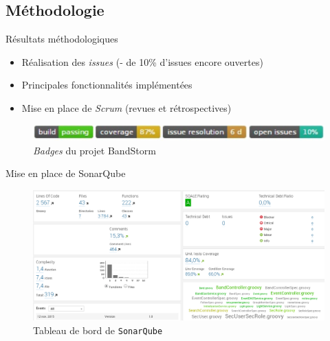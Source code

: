 
\subsection{Méthodologie}
\DylanSpeak
\begin{frame}{Résultats méthodologiques}
	\begin{itemize}
	\item Réalisation des \textit{issues} \scriptsize{(- de 10\% d’issues encore ouvertes)}
	\normalsize
	\item Principales fonctionnalités implémentées
	\item Mise en place de \textit{Scrum} \scriptsize{(revues et rétrospectives)}
	\end{itemize}
	\begin{figure}[H]
		\centering
		\includegraphics[width=0.8\linewidth]{"images/Results/methodo/badges"}
		\caption{\textit{Badges} du projet BandStorm}
		\label{fig:badges}
	\end{figure}\end{frame}
\SteveSpeak
\begin{frame}{Mise en place de SonarQube}
\begin{figure}
	\centering
	\includegraphics[width=0.95\linewidth]{"images/Results/methodo/sonar"}
	\caption{Tableau de bord de \texttt{SonarQube}}
	\label{fig:sonar}
\end{figure}
	
\end{frame}

